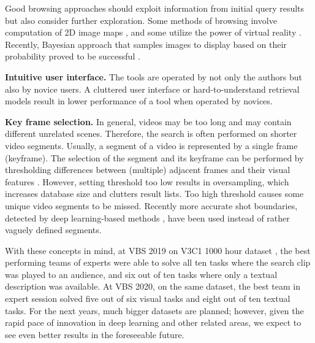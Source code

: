 \begin{description}[labelwidth=1em, leftmargin=!]
	Good browsing approaches should exploit information from initial query results but also consider further exploration. Some methods of browsing involve computation of 2D image maps \cite{KlausVBS2019_sketchsearch, KlausWikiView}, and some utilize the power of virtual reality \cite{DuaneGurrin_VirtualReality_LSC2018}. Recently, Bayesian approach that samples images to display based on their probability proved to be successful \cite{SOMHunterVBS2020}.
	\item \textbf{Intuitive user interface.} The tools are operated by not only the authors but also by novice users. A cluttered user interface or hard-to-understand retrieval models result in lower performance of a tool when operated by novices.
\end{description}
\begin{description}[labelwidth=1em, leftmargin=!]
	\item \textbf{Key frame selection.} In general, videos may be too long and may contain different unrelated scenes. Therefore, the search is often performed on shorter video segments. Usually, a segment of a video is represented by a single frame (keyframe). The selection of the segment and its keyframe can be performed by thresholding differences between (multiple) adjacent frames and their visual features \cite{V3C1dataset}. However, setting threshold too low results in oversampling, which increases database size and clutters result lists. Too high threshold causes some unique video segments to be missed. Recently more accurate shot boundaries, detected by deep learning-based methods \cite{LokocMM2019}, have been used instead of rather vaguely defined segments.
\end{description}
With these concepts in mind, at VBS 2019 \cite{VBS2019_overview} on V3C1 1000 hour dataset \cite{V3C1dataset}, the best performing teams of experts were able to solve all ten tasks where the search clip was played to an audience, and six out of ten tasks where only a textual description was available. At VBS 2020, on the same dataset, the best team in expert session solved five out of six visual tasks and eight out of ten textual tasks. For the next years, much bigger datasets are planned; however, given the rapid pace of innovation in deep learning and other related areas, we expect to see even better results in the foreseeable future.


